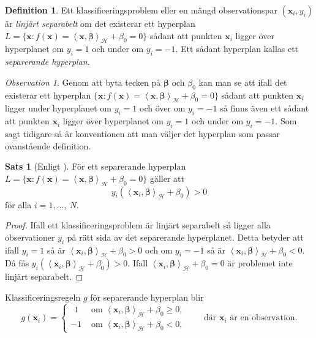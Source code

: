 \documentclass[a4paper, 12pt]{report}
\theoremstyle{definition}
\newtheorem{thm}{Sats}[section]
\newtheorem{defi}{Definition}[section]
\theoremstyle{remark}
\newtheorem*{rem}{Observation}
\newcommand{\bfbeta}{{\boldsymbol{\beta}}}
\newcommand{\bfx}{\mathbf{x}}
\newcommand{\llangle}{\left\langle}
\newcommand{\rrangle}{\right\rangle}
\newcommand{\sephyp}{\{ \mathbf{x} : f\left(\mathbf{x}\right)=\inner{\bfx}{\bfbeta}_\mathcal{H} + \beta_0=0\}}
\newcommand{\inner}[2]{\llangle #1, #2 \rrangle}
\newcommand{\hil}{\mathcal{H}}
\begin{document}
\begin{defi}
	Ett klassificeringsproblem eller en mängd observationspar $\left(\mathbf{x}_i, y_i\right)$ är \textit{linjärt separabelt} om det existerar ett hyperplan $L=\sephyp$ sådant att punkten $\bfx_i$ ligger över hyperplanet om $y_i=1$ och under om $y_i=-1$. Ett sådant hyperplan kallas ett \emph{separerande hyperplan}.
\end{defi}
\begin{rem}
	Genom att byta tecken på $\bfbeta$ och $\beta_0$ kan man se att ifall det existerar ett hyperplan $\sephyp$ sådant att punkten $\bfx_i$ ligger under hyperplanet om $y_i=1$ och över om $y_i=-1$ så finns även ett sådant att punkten $\bfx_i$ ligger över hyperplanet om $y_i=1$ och under om $y_i=-1$.
	Som sagt tidigare så är konventionen att man väljer det hyperplan som passar ovanstående definition.
\end{rem}
\begin{thm}[Enligt \cite{Boyd}]
	För ett separerande hyperplan $L=\sephyp$ gäller att 
	\begin{equation*}
		y_i\left(\inner{\bfx_i}{\bfbeta}_\hil + \beta_0\right) > 0
	\end{equation*}
	för alla $i = 1, \dots,~N$.
\end{thm}
\begin{proof}
	Ifall ett klassificeringsproblem är linjärt separabelt så ligger alla observationer $y_i$ på rätt sida av det separerande hyperplanet. Detta betyder att ifall $y_i=1$ så är $\inner{\bfx_i}{\bfbeta}_\hil + \beta_0 > 0$ och om $y_i=-1$ så är $\inner{\bfx_i}{\bfbeta}_\hil + \beta_0 < 0$.
	Då fås $y_i\left(\inner{\bfx_i}{\bfbeta}_\hil + \beta_0\right) > 0$. Ifall $\inner{\bfx_i}{\bfbeta}_\hil + \beta_0 = 0$ är problemet inte linjärt separabelt.
\end{proof}

Klassificeringsregeln $g$ för separerande hyperplan blir
\begin{equation*}
g\left(\mathbf{x}_i\right)=  
\begin{cases}
~~ 1 &\text{ om } \inner{\bfx_i}{\bfbeta}_\hil + \beta_0 \geq 0,\\
-1 &\text{ om } \inner{\bfx_i}{\bfbeta}_\hil + \beta_0 < 0,
\end{cases}\qquad\text{där }\bfx_i\text{ är en observation.}
\end{equation*}
\end{document}
